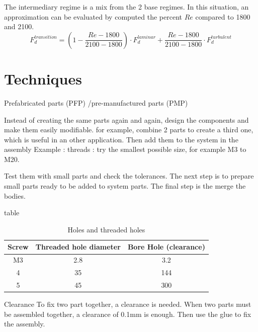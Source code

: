 \documentclass[12pt,a4paper]{article}
\begin{document}
	The intermediary regime is a mix from the 2 base regimes. In this situation, an approximation can be evaluated by computed the percent $Re$ compared to 1800 and 2100. 
	\begin{equation}
		F_d^{transition} = (1- \frac{Re - 1800}{2100-1800}) \cdot F_d^{laminar} + \frac{Re - 1800}{2100-1800} \cdot F_d^{turbulent}
	\end{equation}
	
	
	\newpage
	\section{Techniques}
	Prefabricated parts (PFP) /pre-manufactured parts (PMP)
	
	Instead of creating the same parts again and again, design the components and make them easily modifiable.
	for example, combine 2 parts to create a third one, which is useful in an other application. Then add them to the system in the assembly
	Example : threads : try the smallest possible size, for example M3 to M20. 
	
	Test them with small parts and check the tolerances. 
	The next step is to prepare small parts ready to be added to system parts. The final step is the merge the bodies. 
	
	
	table
	
	\begin{table}[ht]
		\caption{Holes and threaded holes} %
		\centering %
		\begin{tabular}{c c c} %
			\hline\hline %
			Screw & Threaded hole diameter & Bore Hole (clearance) \\ [0.5ex] %
			\hline %
			M3 & 2.8 & 3.2 \\ %
			4 & 35 & 144 \\
			5 & 45 & 300 \\ [1ex] %
			\hline %
		\end{tabular}\label{table:nonlin} %
	\end{table}
	
	Clearance
	To fix two part together, a clearance is needed.
	When two parts must be assembled together, a clearance of 0.1mm is enough. Then use the glue to fix the assembly. 
	
	
	
\end{document}

